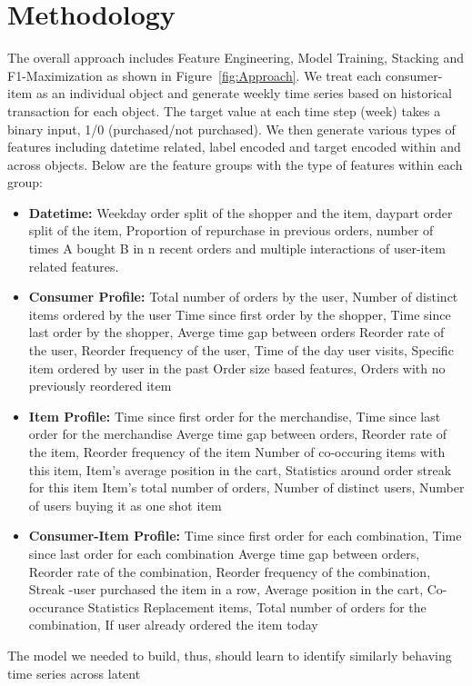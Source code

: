 \section{Methodology}
The overall approach includes Feature Engineering, Model Training, Stacking and F1-Maximization as shown 
in Figure~\ref{fig:Approach}.
We treat each consumer-item as an individual object and generate weekly time series based on historical transaction for 
each object. The target value at each time step (week) takes a binary input, 1/0 (purchased/not purchased).
We then generate various types of features including datetime related, label encoded and target encoded 
within and across objects. Below are the feature groups with the type of features within each group:
\begin{itemize}
\item {\bf Datetime:} Weekday order split of the shopper and the item, daypart order split of the item, Proportion of 
repurchase in previous orders, number of times A bought B in n recent orders and multiple interactions of 
user-item related features.
\item {\bf Consumer Profile:} Total number of orders by the user, Number of distinct items ordered by the user
Time since first order by the shopper, Time since last order by the shopper, Averge time gap between orders
Reorder rate of the user, Reorder frequency of the user, Time of the day user visits, Specific item ordered by user in the past
Order size based features, Orders with no previously reordered item
\item {\bf Item Profile:} Time since first order for the merchandise, Time since last order for the merchandise
Averge time gap between orders, Reorder rate of the item, Reorder frequency of the item
Number of co-occuring items with this item, Item's average position in the cart, Statistics around order streak for this item
Item's total number of orders, Number of distinct users, Number of users buying it as one shot item
\item {\bf Consumer-Item Profile:} Time since first order for each combination, Time since last order for each combination
Averge time gap between orders, Reorder rate of the combination, Reorder frequency of the combination, 
Streak -user purchased the item in a row, Average position in the cart, Co-occurance Statistics
Replacement items, Total number of orders for the combination, If user already ordered the item today
\end{itemize}
The model we needed to build, thus, should learn to identify similarly behaving time series across latent
